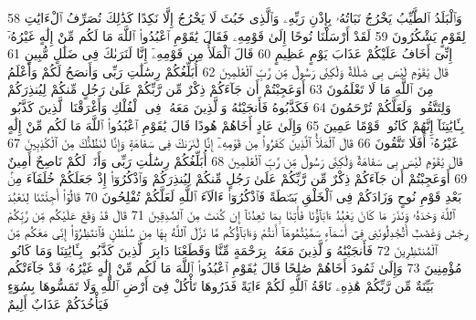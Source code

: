 {\tiny\colorbox{cl_aya}{58}} وَٱلْبَلَدُ ٱلطَّيِّبُ يَخْرُجُ نَبَاتُهُۥ بِإِذْنِ رَبِّهِۦ وَٱلَّذِى خَبُثَ لَا يَخْرُجُ إِلَّا نَكِدًا كَذَٰلِكَ نُصَرِّفُ ٱلْءَايَٰتِ لِقَوْمٍ يَشْكُرُونَ
{\tiny\colorbox{cl_aya}{59}} لَقَدْ أَرْسَلْنَا نُوحًا إِلَىٰ قَوْمِهِۦ فَقَالَ يَٰقَوْمِ ٱعْبُدُوا۟ ٱللَّهَ مَا لَكُم مِّنْ إِلَٰهٍ غَيْرُهُۥٓ إِنِّىٓ أَخَافُ عَلَيْكُمْ عَذَابَ يَوْمٍ عَظِيمٍ
{\tiny\colorbox{cl_aya}{60}} قَالَ ٱلْمَلَأُ مِن قَوْمِهِۦٓ إِنَّا لَنَرَىٰكَ فِى ضَلَٰلٍ مُّبِينٍ
{\tiny\colorbox{cl_aya}{61}} قَالَ يَٰقَوْمِ لَيْسَ بِى ضَلَٰلَةٌ وَلَٰكِنِّى رَسُولٌ مِّن رَّبِّ ٱلْعَٰلَمِينَ
{\tiny\colorbox{cl_aya}{62}} أُبَلِّغُكُمْ رِسَٰلَٰتِ رَبِّى وَأَنصَحُ لَكُمْ وَأَعْلَمُ مِنَ ٱللَّهِ مَا لَا تَعْلَمُونَ
{\tiny\colorbox{cl_aya}{63}} أَوَعَجِبْتُمْ أَن جَآءَكُمْ ذِكْرٌ مِّن رَّبِّكُمْ عَلَىٰ رَجُلٍ مِّنكُمْ لِيُنذِرَكُمْ وَلِتَتَّقُوا۟ وَلَعَلَّكُمْ تُرْحَمُونَ
{\tiny\colorbox{cl_aya}{64}} فَكَذَّبُوهُ فَأَنجَيْنَٰهُ وَٱلَّذِينَ مَعَهُۥ فِى ٱلْفُلْكِ وَأَغْرَقْنَا ٱلَّذِينَ كَذَّبُوا۟ بِـَٔايَٰتِنَآ إِنَّهُمْ كَانُوا۟ قَوْمًا عَمِينَ
{\tiny\colorbox{cl_aya}{65}} وَإِلَىٰ عَادٍ أَخَاهُمْ هُودًا قَالَ يَٰقَوْمِ ٱعْبُدُوا۟ ٱللَّهَ مَا لَكُم مِّنْ إِلَٰهٍ غَيْرُهُۥٓ أَفَلَا تَتَّقُونَ
{\tiny\colorbox{cl_aya}{66}} قَالَ ٱلْمَلَأُ ٱلَّذِينَ كَفَرُوا۟ مِن قَوْمِهِۦٓ إِنَّا لَنَرَىٰكَ فِى سَفَاهَةٍ وَإِنَّا لَنَظُنُّكَ مِنَ ٱلْكَٰذِبِينَ
{\tiny\colorbox{cl_aya}{67}} قَالَ يَٰقَوْمِ لَيْسَ بِى سَفَاهَةٌ وَلَٰكِنِّى رَسُولٌ مِّن رَّبِّ ٱلْعَٰلَمِينَ
{\tiny\colorbox{cl_aya}{68}} أُبَلِّغُكُمْ رِسَٰلَٰتِ رَبِّى وَأَنَا۠ لَكُمْ نَاصِحٌ أَمِينٌ
{\tiny\colorbox{cl_aya}{69}} أَوَعَجِبْتُمْ أَن جَآءَكُمْ ذِكْرٌ مِّن رَّبِّكُمْ عَلَىٰ رَجُلٍ مِّنكُمْ لِيُنذِرَكُمْ وَٱذْكُرُوٓا۟ إِذْ جَعَلَكُمْ خُلَفَآءَ مِنۢ بَعْدِ قَوْمِ نُوحٍ وَزَادَكُمْ فِى ٱلْخَلْقِ بَصْۜطَةً فَٱذْكُرُوٓا۟ ءَالَآءَ ٱللَّهِ لَعَلَّكُمْ تُفْلِحُونَ
{\tiny\colorbox{cl_aya}{70}} قَالُوٓا۟ أَجِئْتَنَا لِنَعْبُدَ ٱللَّهَ وَحْدَهُۥ وَنَذَرَ مَا كَانَ يَعْبُدُ ءَابَآؤُنَا فَأْتِنَا بِمَا تَعِدُنَآ إِن كُنتَ مِنَ ٱلصَّٰدِقِينَ
{\tiny\colorbox{cl_aya}{71}} قَالَ قَدْ وَقَعَ عَلَيْكُم مِّن رَّبِّكُمْ رِجْسٌ وَغَضَبٌ أَتُجَٰدِلُونَنِى فِىٓ أَسْمَآءٍ سَمَّيْتُمُوهَآ أَنتُمْ وَءَابَآؤُكُم مَّا نَزَّلَ ٱللَّهُ بِهَا مِن سُلْطَٰنٍ فَٱنتَظِرُوٓا۟ إِنِّى مَعَكُم مِّنَ ٱلْمُنتَظِرِينَ
{\tiny\colorbox{cl_aya}{72}} فَأَنجَيْنَٰهُ وَٱلَّذِينَ مَعَهُۥ بِرَحْمَةٍ مِّنَّا وَقَطَعْنَا دَابِرَ ٱلَّذِينَ كَذَّبُوا۟ بِـَٔايَٰتِنَا وَمَا كَانُوا۟ مُؤْمِنِينَ
{\tiny\colorbox{cl_aya}{73}} وَإِلَىٰ ثَمُودَ أَخَاهُمْ صَٰلِحًا قَالَ يَٰقَوْمِ ٱعْبُدُوا۟ ٱللَّهَ مَا لَكُم مِّنْ إِلَٰهٍ غَيْرُهُۥ قَدْ جَآءَتْكُم بَيِّنَةٌ مِّن رَّبِّكُمْ هَٰذِهِۦ نَاقَةُ ٱللَّهِ لَكُمْ ءَايَةً فَذَرُوهَا تَأْكُلْ فِىٓ أَرْضِ ٱللَّهِ وَلَا تَمَسُّوهَا بِسُوٓءٍ فَيَأْخُذَكُمْ عَذَابٌ أَلِيمٌ
